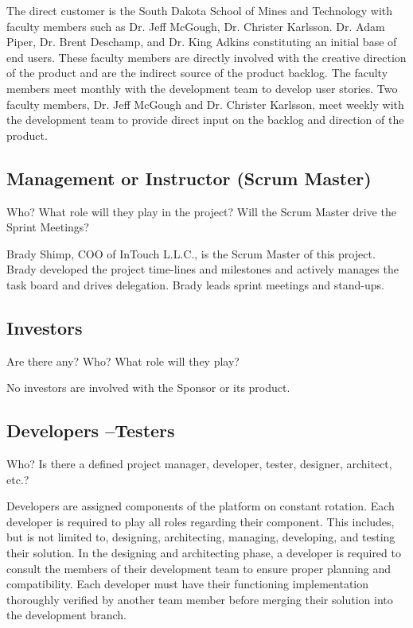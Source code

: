 The direct customer is the South Dakota School of Mines and Technology with faculty members such as Dr. Jeff McGough, Dr. Christer Karlsson. Dr. Adam Piper, Dr. Brent Deschamp, and Dr. King Adkins constituting an initial base of end users. These faculty members are directly involved with the creative direction of the product and are the indirect source of the product backlog. The faculty members meet monthly with the development team to develop user stories. Two faculty members, Dr. Jeff McGough and Dr. Christer Karlsson, meet weekly with the development team to provide direct input on the backlog and direction of the product. 

\subsection{Management or Instructor (Scrum Master)}
Who?  What role will they play in the project?  Will the Scrum Master drive the 
Sprint Meetings? 

Brady Shimp, COO of InTouch L.L.C., is the Scrum Master of this project. Brady developed the project time-lines and milestones and actively manages the task board and drives delegation. Brady leads sprint meetings and stand-ups. 


\subsection{Investors}
Are there any?  Who?  What role will they play? 

No investors are involved with the Sponsor or its product. 

\subsection{Developers --Testers}
Who?  Is there a defined project manager, developer, tester, designer, architect, 
etc.? 

Developers are assigned components of the platform on constant rotation. Each developer is required to play all roles regarding their component. This includes, but is not limited to, designing, architecting, managing, developing, and testing their solution. In the designing and architecting phase, a developer is required to consult the members of their development team to ensure proper planning and compatibility. Each developer must have their functioning implementation thoroughly verified by another team member before merging their solution into the development branch. 

